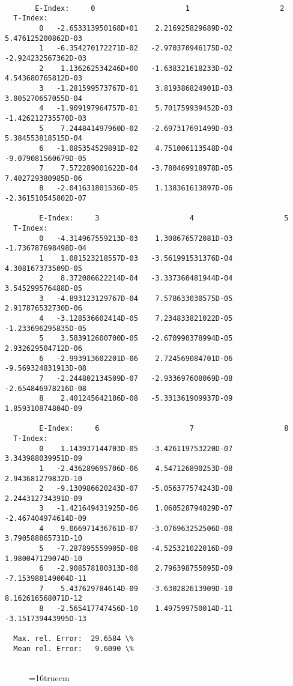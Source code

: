 \documentclass[12pt,dvipdfmx]{article}
\begin{document}
\begin{small}\begin{verbatim}

       E-Index:     0                     1                     2
  T-Index:
        0   -2.653313950168D+01    2.216925829689D-02    5.476125200862D-03
        1   -6.354270172271D-02   -2.970370946175D-02   -2.924232567362D-03
        2    1.136262534246D+00   -1.638321618233D-02    4.543680765812D-03
        3   -1.281599573767D-01    3.819386824901D-03    3.005270657055D-04
        4   -1.909197964757D-01    5.701759939452D-03   -1.426212735570D-03
        5    7.244841497960D-02   -2.697317691499D-03    5.384553818515D-04
        6   -1.085354529891D-02    4.751006113548D-04   -9.079081560679D-05
        7    7.572289001622D-04   -3.780469918978D-05    7.402729380985D-06
        8   -2.041631801536D-05    1.138361613897D-06   -2.361510545802D-07

        E-Index:     3                     4                     5
  T-Index:
        0   -4.314967559213D-03    1.308676572081D-03   -1.736787698498D-04
        1    1.081523218557D-03   -3.561991531376D-04    4.308167373509D-05
        2    8.372086622214D-04   -3.337360481944D-04    3.545299576488D-05
        3   -4.893123129767D-04    7.578633030575D-05    2.917876532730D-06
        4   -3.128536602414D-05    7.234833821022D-05   -1.233696295835D-05
        5    3.583912600700D-05   -2.670990378994D-05    2.932629504712D-06
        6   -2.993913602201D-06    2.724569084701D-06   -9.569324831913D-08
        7   -2.244802134509D-07   -2.933697608069D-08   -2.654846978216D-08
        8    2.401245642186D-08   -5.331361909937D-09    1.859310874804D-09

        E-Index:     6                     7                     8
  T-Index:
        0    1.143937144703D-05   -3.426119753220D-07    3.343988039951D-09
        1   -2.436289695706D-06    4.547126890253D-08    2.943681279832D-10
        2   -9.130986620243D-07   -5.056377574243D-08    2.244312734391D-09
        3   -1.421649431925D-06    1.060528794829D-07   -2.467404974614D-09
        4    9.066971436761D-07   -3.076963252506D-08    3.790588865731D-10
        5   -7.287895559905D-08   -4.525321022016D-09    1.980047129074D-10
        6   -2.908578180313D-08    2.796398755095D-09   -7.153988149004D-11
        7    5.437629784614D-09   -3.630282613909D-10    8.162616568071D-12
        8   -2.565417747456D-10    1.497599750014D-11   -3.151739443995D-13

  Max. rel. Error:  29.6584 \%
  Mean rel. Error:   9.6090 \%


\end{verbatim}\end{small}
\begin{figure} \label{2.3.8rl}
\epsfxsize=16truecm 
\end{figure}
\newpage
\end{document}
